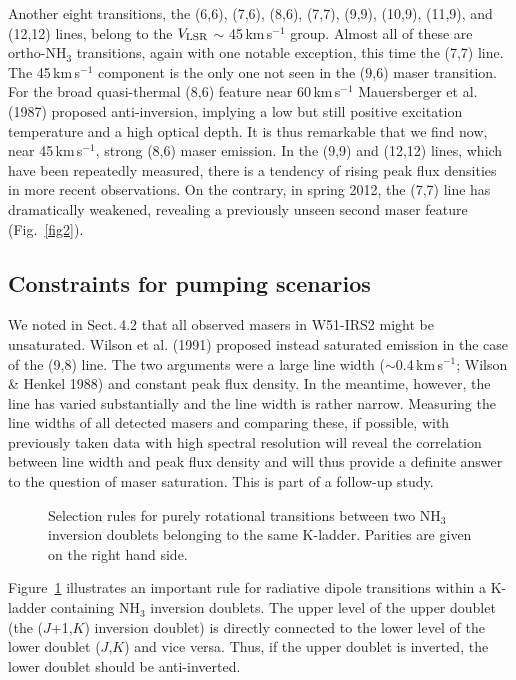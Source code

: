\documentclass[oldversion]{aa}
\begin{document}
Another eight transitions, the (6,6), (7,6), (8,6), (7,7), 
(9,9), (10,9), (11,9), and (12,12) lines, belong to the 
$V_{\rm LSR}$ $\sim$ 45\,km\,s$^{-1}$ group. Almost all of 
these are ortho-NH$_3$ transitions, again with one notable
exception, this time the (7,7) line. The 45\,km\,s$^{-1}$ 
component is the only one not seen in the (9,6) maser 
transition. For the broad quasi-thermal (8,6) feature near 
60\,km\,s$^{-1}$ Mauersberger et al. (1987) proposed 
anti-inversion, implying a low but still positive excitation
temperature and a high optical depth. It is thus remarkable that 
we find now, near 45\,km\,s$^{-1}$, strong (8,6) maser emission. 
In the (9,9) and (12,12) lines, which have been repeatedly 
measured, there is a tendency of rising peak flux densities 
in more recent observations. On the contrary, in spring 2012,
the (7,7) line has dramatically weakened, revealing a previously 
unseen second maser feature (Fig.~\ref{fig2}).   


\subsection{Constraints for pumping scenarios}

We noted in Sect.\,4.2 that all observed masers in W51-IRS2 might 
be unsaturated. Wilson et al. (1991) proposed instead saturated
emission in the case of the (9,8) line. The two arguments were
a large line width ($\sim$0.4\,km\,s$^{-1}$; Wilson \& Henkel 1988)
and constant peak flux density. In the meantime, however, the line
has varied substantially and the line width is rather narrow. 
Measuring the line widths of all detected masers and comparing 
these, if possible, with previously taken data with high spectral
resolution will reveal the correlation between line width and 
peak flux density and will thus provide a definite answer to the 
question of maser saturation. This is part of a follow-up study.


\begin{figure}[t]
\vspace{0.0cm}
\centering
{}
\vspace{-0.0cm}
\caption{Selection rules for purely rotational transitions between two NH$_3$ 
inversion doublets belonging to the same K-ladder. Parities are given on the right 
hand side.
\label{fig10}}
\end{figure}


Figure~\ref{fig10} illustrates an important rule for radiative dipole
transitions within a K-ladder containing NH$_3$ inversion
doublets. The upper level of the upper doublet (the ($J$+1,$K$)
inversion doublet) is directly connected to the lower level 
of the lower doublet ($J$,$K$) and vice versa. Thus, if 
the upper doublet is inverted, the lower doublet should 
be anti-inverted. 
\end{document}
